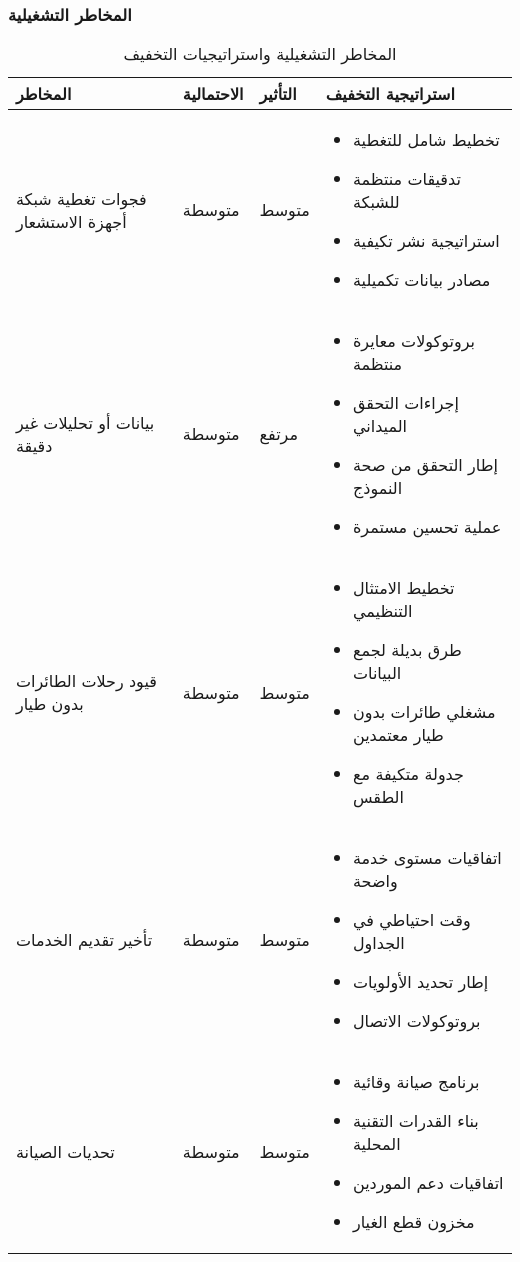 \subsubsection{المخاطر التشغيلية}
\begin{table}[H]
\centering
\begin{tabular}{|p{3cm}|p{2cm}|p{2cm}|p{7cm}|}
\hline
\textbf{المخاطر} & \textbf{الاحتمالية} & \textbf{التأثير} & \textbf{استراتيجية التخفيف} \\
\hline
فجوات تغطية شبكة أجهزة الاستشعار & متوسطة & متوسط & 
\begin{itemize}
    \item تخطيط شامل للتغطية
    \item تدقيقات منتظمة للشبكة
    \item استراتيجية نشر تكيفية
    \item مصادر بيانات تكميلية
\end{itemize} \\
\hline
بيانات أو تحليلات غير دقيقة & متوسطة & مرتفع & 
\begin{itemize}
    \item بروتوكولات معايرة منتظمة
    \item إجراءات التحقق الميداني
    \item إطار التحقق من صحة النموذج
    \item عملية تحسين مستمرة
\end{itemize} \\
\hline
قيود رحلات الطائرات بدون طيار & متوسطة & متوسط & 
\begin{itemize}
    \item تخطيط الامتثال التنظيمي
    \item طرق بديلة لجمع البيانات
    \item مشغلي طائرات بدون طيار معتمدين
    \item جدولة متكيفة مع الطقس
\end{itemize} \\
\hline
تأخير تقديم الخدمات & متوسطة & متوسط & 
\begin{itemize}
    \item اتفاقيات مستوى خدمة واضحة
    \item وقت احتياطي في الجداول
    \item إطار تحديد الأولويات
    \item بروتوكولات الاتصال
\end{itemize} \\
\hline
تحديات الصيانة & متوسطة & متوسط & 
\begin{itemize}
    \item برنامج صيانة وقائية
    \item بناء القدرات التقنية المحلية
    \item اتفاقيات دعم الموردين
    \item مخزون قطع الغيار
\end{itemize} \\
\hline
\end{tabular}
\caption{المخاطر التشغيلية واستراتيجيات التخفيف}
\end{table}

